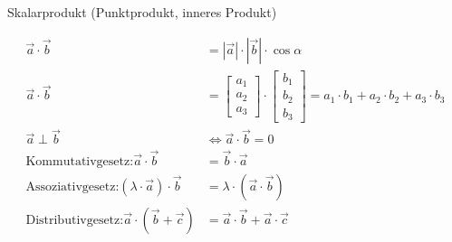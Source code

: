 \begin{sectionbox}
	Skalarprodukt (Punktprodukt, inneres Produkt)
	\begin{emphbox}
		\begin{align*}
			\overrightarrow{a} \cdot \overrightarrow{b} &= |\overrightarrow{a}| \cdot |\overrightarrow{b}| \cdot \cos \alpha \\
			\overrightarrow{a} \cdot \overrightarrow{b} &= \begin{bmatrix} a_1 \\ a_2 \\ a_3 \end{bmatrix} \cdot \begin{bmatrix} b_1 \\ b_2 \\ b_3 \end{bmatrix} = a_1 \cdot b_1 + a_2 \cdot b_2 + a_3 \cdot b_3 \\
			\overrightarrow{a} \perp \overrightarrow{b} &\Leftrightarrow \overrightarrow{a} \cdot \overrightarrow{b} = 0 \\
			\text{Kommutativgesetz:} \overrightarrow{a} \cdot \overrightarrow{b} &= \overrightarrow{b} \cdot \overrightarrow{a} \\
			\text{Assoziativgesetz:} (\lambda \cdot \overrightarrow{a}) \cdot \overrightarrow{b} &= \lambda \cdot (\overrightarrow{a} \cdot \overrightarrow{b}) \\
			\text{Distributivgesetz:}	\overrightarrow{a} \cdot (\overrightarrow{b} + \overrightarrow{c}) &= \overrightarrow{a} \cdot \overrightarrow{b} + \overrightarrow{a} \cdot \overrightarrow{c}
		\end{align*}
	\end{emphbox}


\end{sectionbox}
